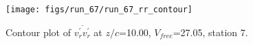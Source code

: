 \begin{figure}[H]
\centering
\texttt{[image: figs/run\_67/run\_67\_rr\_contour]}
\caption{Contour plot of $\overline{v_{r}^{\prime} v_{r}^{\prime}}$ at $z/c$=10.00, $V_{free}$=27.05, station 7.}
\label{fig:run_67_rr_contour}
\end{figure}


